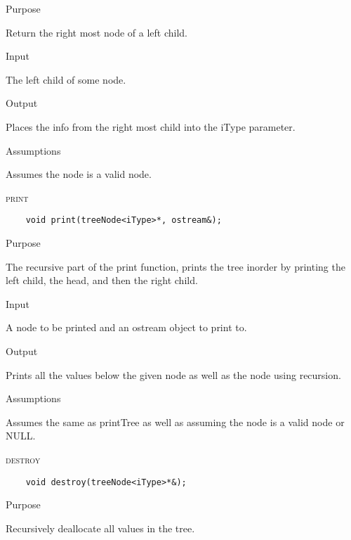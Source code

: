 \documentclass[pdftex, 12pt]{article}
\begin{document}
\begin{description}
\begin{description}
			\item{Purpose}

				Return the right most node of a left child.

			\item{Input}

				The left child of some node.

			\item{Output}

				Places the info from the right most child into the iType parameter.

			\item{Assumptions}

				Assumes the node is a valid node.

		\end{description}
	\item{\textsc{print}}
\begin{lstlisting}
	void print(treeNode<iType>*, ostream&);
\end{lstlisting}
		\begin{description}

			\item{Purpose}
				
				The recursive part of the print function, prints the tree inorder by printing the left child, the head,
				and then the right child.

			\item{Input}

				A node to be printed and an ostream object to print to.

			\item{Output}

				Prints all the values below the given node as well as the node using recursion.

			\item{Assumptions}
			
				Assumes the same as printTree as well as assuming the node is a valid node or NULL.

		\end{description}
	\item{\textsc{destroy}}
\begin{lstlisting}
	void destroy(treeNode<iType>*&);
\end{lstlisting}
		\begin{description}

			\item{Purpose}

				Recursively deallocate all values in the tree.


\end{description}
\end{description}
\end{document}

